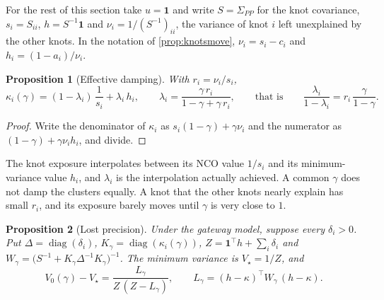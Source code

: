 \documentclass[11pt]{article}
\newcommand{\ones}{\mathbf{1}}
\newtheorem{proposition}{Proposition}
\begin{document}
For the rest of this section take $u=\ones$ and write $S=\Sigma_{PP}$ for
the knot covariance, $s_i=S_{ii}$, $h=S^{-1}\ones$ and
$\nu_i=1/(S^{-1})_{ii}$, the variance of knot $i$ left unexplained by the
other knots. In the notation of \cref{prop:knotsmove},
$\nu_i=s_i-c_i$ and $h_i=(1-a_i)/\nu_i$.

\begin{proposition}[Effective damping]
\label{prop:effective}
With $r_i=\nu_i/s_i$,
\begin{equation}
  \kappa_i(\gamma)=(1-\lambda_i)\,\frac{1}{s_i}+\lambda_i\,h_i,
  \qquad
  \lambda_i=\frac{\gamma\,r_i}{1-\gamma+\gamma\,r_i},
  \qquad\text{that is}\qquad
  \frac{\lambda_i}{1-\lambda_i}=r_i\,\frac{\gamma}{1-\gamma}.
  \label{eq:effective}
\end{equation}
\end{proposition}

\begin{proof}
Write the denominator of $\kappa_i$ as $s_i(1-\gamma)+\gamma\nu_i$ and the
numerator as $(1-\gamma)+\gamma\nu_ih_i$, and divide.
\end{proof}

The knot exposure interpolates between its NCO value $1/s_i$ and its
minimum-variance value $h_i$, and $\lambda_i$ is the interpolation actually
achieved. A common $\gamma$ does not damp the clusters equally. A knot that
the other knots nearly explain has small $r_i$, and its exposure barely
moves until $\gamma$ is very close to $1$.

\begin{proposition}[Lost precision]
\label{prop:lost}
Under the gateway model, suppose every $\delta_i>0$. Put $\Delta=\operatorname{diag}(\delta_i)$,
$K_\gamma=\operatorname{diag}(\kappa_i(\gamma))$,
$Z=\ones^\top h+\sum_i\delta_i$ and
$W_\gamma=\big(S^{-1}+K_\gamma\Delta^{-1}K_\gamma\big)^{-1}$. The minimum
variance is $V_\star=1/Z$, and
\begin{equation}
  V_0(\gamma)-V_\star=\frac{L_\gamma}{Z\,(Z-L_\gamma)},
  \qquad
  L_\gamma=(h-\kappa)^\top W_\gamma\,(h-\kappa).
  \label{eq:lost}
\end{equation}
\end{proposition}
\end{document}
